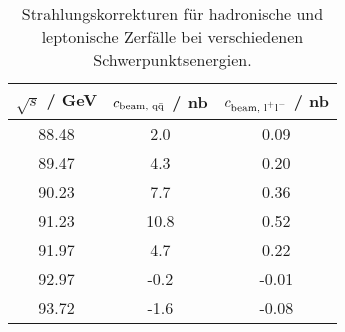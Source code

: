 \begin{table}[H]
\caption{Strahlungskorrekturen für hadronische und leptonische Zerfälle bei verschiedenen Schwerpunktsenergien.}
\begin{center}
\begin{tabular}{|c|c|c|}
  \hline
  $\sqrt{s}$ / GeV & $c_\text{beam, q$\bar{\text{q}}$}$ / nb & $c_\text{beam, l$^+$l$^-$}$ / nb \\ \hline
  88.48 & 2.0 & 0.09 \\ \hline
  89.47 & 4.3 & 0.20 \\ \hline
  90.23 & 7.7 & 0.36 \\ \hline
  91.23 & 10.8 & 0.52 \\ \hline
  91.97 & 4.7 & 0.22 \\ \hline
  92.97 & -0.2 & -0.01 \\ \hline
  93.72 & -1.6 & -0.08 \\ \hline
\end{tabular}
\end{center}
\label{tab:beamcorrs}
\end{table}
